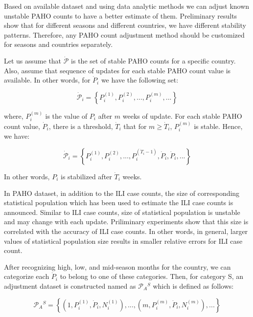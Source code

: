 
Based on available dataset and using data analytic methods we can adjust known unstable PAHO counts to have a better estimate of them. Preliminary results show that for different seasons and different countries, we have different stability patterns. Therefore, any PAHO count adjustment method should be customized for seasons and countries separately. 

Let us assume that $\dot{\mathcal{P}}$ is the set of stable PAHO counts for a specific country. Also, assume that sequence of updates for each stable PAHO count value is available. In other words, for $\dot{P}_i$ we have the following set:
 
\begin{equation}
\dot{\mathcal{P}}_i = \left \{P_i^{(1)},P_i^{(2)},...,P_i^{(m)},...  \right \}
\end{equation}

where, $P_i^{(m)}$ is the value of $P_i$ after $m$ weeks of update. For each stable PAHO count value, $\dot{P}_i$, there is a threshold, $\dot{T}_i$ that for $m \ge \dot{T}_i$, $P_i^{(m)}$ is stable. Hence, we have:

\begin{equation}
\dot{\mathcal{P}}_i = \left \{P_i^{(1)},P_i^{(2)},...,P_i^{(\dot{T}_i-1)},\dot{P}_i,\dot{P}_i,...  \right \}
\end{equation}

In other words, $P_i$ is stabilized after $\dot{T}_i$ weeks.

In PAHO dataset, in addition to the ILI case counts, the size of corresponding statistical population which has been used to estimate the ILI case counts is announced. Similar to ILI case counts, size of statistical population is unstable and may change with each update. Priliminary experiments show that this size is correlated with the accuracy of ILI case counts. In other words, in general, larger values of statistical population size results in smaller relative errors for ILI case count.

After recognizing high, low, and mid-season months for the country, we can categorize each $\dot{P}_i$ to belong to one of these categories. Then, for category S, an adjustment dataset is constructed named as $\mathcal{P}_A{^S}$ which is defined as follows:

\begin{equation}
\mathcal{P}_A{^S} = \left \{ (1,P_i^{(1)},\dot{P}_i,N_i^{(1)}),...,(m,P_i^{(m)},\dot{P}_i,N_i^{(m)}), ...  \right \}
\end{equation}

